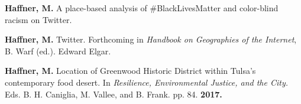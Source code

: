 

\begin{cventries}
   \cventry
      {}
      {}
      {}
      {}
      {
        \begin{cvitems}
          \vspace{-4mm}
        \item
          {\textbf{Haffner, M.}
            A place-based analysis of \#BlackLivesMatter and color-blind racism on Twitter. } \\
          \vspace{-2mm}
        \end{cvitems}
    }

\end{cventries}



\begin{cventries}
   \cventry
      {}
      {}
      {}
      {}
      {
        \begin{cvitems}
          \vspace{-4mm}
        \item {\textbf{Haffner, M.} Twitter. Forthcoming in \textit{Handbook on
              Geographies of the Internet}, B. Warf (ed.). Edward Elgar.}
          \vspace{-2mm}
        \end{cvitems}
    }

\end{cventries}



\begin{cventries}
   \cventry
      {}
      {}
      {}
      {}
      {
        \begin{cvitems}
          \vspace{-4mm}
        \item {\textbf{Haffner, M.} Location of Greenwood Historic District
            within Tulsa's contemporary food desert. In \textit{Resilience,
              Environmental Justice, and the City.} Eds. B. H. Caniglia, M.
            Vallee, and B.
            Frank. pp. 84. \textbf{2017.}} \\
          \vspace{-2mm}
        \end{cvitems}
    }

\end{cventries}